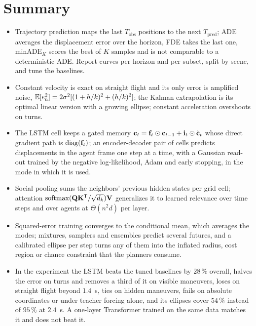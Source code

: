 \section{Summary}
\begin{summary}
\begin{itemize}
  \item Trajectory prediction maps the last $T_{\mathrm{obs}}$ positions to the next $T_{\mathrm{pred}}$; ADE averages the displacement error over the horizon, FDE takes the last one, $\mathrm{minADE}_K$ scores the best of $K$ samples and is not comparable to a deterministic ADE. Report curves per horizon and per subset, split by scene, and tune the baselines.
  \item Constant velocity is exact on straight flight and its only error is amplified noise, $\mathbb{E}[e_h^2] = 2\sigma^2[(1 + h/k)^2 + (h/k)^2]$; the Kalman extrapolation is its optimal linear version with a growing ellipse; constant acceleration overshoots on turns.
  \item The LSTM cell keeps a gated memory $\mathbf{c}_t = \mathbf{f}_t \odot \mathbf{c}_{t-1} + \mathbf{i}_t \odot \tilde{\mathbf{c}}_t$ whose direct gradient path is $\operatorname{diag}(\mathbf{f}_t)$; an encoder-decoder pair of cells predicts displacements in the agent frame one step at a time, with a Gaussian read-out trained by the negative log-likelihood, Adam and early stopping, in the mode in which it is used.
  \item Social pooling sums the neighbors' previous hidden states per grid cell; attention $\operatorname{softmax}(\mathbf{Q}\mathbf{K}^{\mathsf{T}}/\sqrt{d_k})\mathbf{V}$ generalizes it to learned relevance over time steps and over agents at $\Theta(n^2 d)$ per layer.
  \item Squared-error training converges to the conditional mean, which averages the modes; mixtures, samplers and ensembles predict several futures, and a calibrated ellipse per step turns any of them into the inflated radius, cost region or chance constraint that the planners consume.
  \item In the experiment the LSTM beats the tuned baselines by $28\,\%$ overall, halves the error on turns and removes a third of it on visible maneuvers, loses on straight flight beyond $1.4$~s, ties on hidden maneuvers, fails on absolute coordinates or under teacher forcing alone, and its ellipses cover $54\,\%$ instead of $95\,\%$ at $2.4$~s. A one-layer Transformer trained on the same data matches it and does not beat it.
\end{itemize}
\end{summary}

